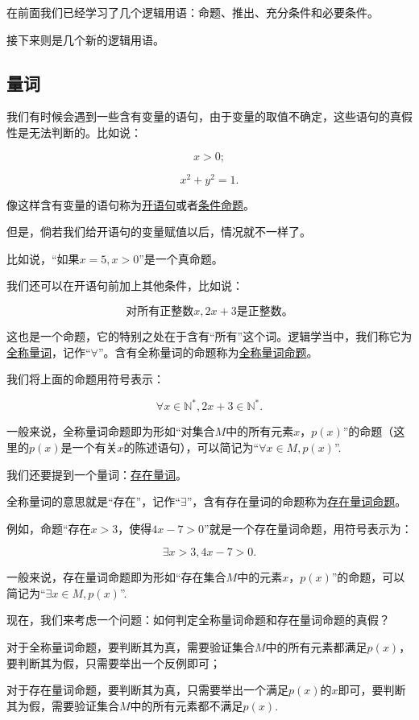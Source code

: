 \documentclass[lang=cn,math=cm,chinesefont=nofont,11pt,scheme=chinese,onecol]{elegantbook}
\begin{document}
在前面我们已经学习了几个逻辑用语：命题、推出、充分条件和必要条件。

接下来则是几个新的逻辑用语。

\subsection{量词}

我们有时候会遇到一些含有变量的语句，由于变量的取值不确定，这些语句的真假性是无法判断的。比如说：

$$x>0;$$

$$x^2+y^2=1.$$

像这样含有变量的语句称为\underline{开语句}或者\underline{条件命题}。

但是，倘若我们给开语句的变量赋值以后，情况就不一样了。

比如说，“如果$x=5,x>0$”是一个真命题。

我们还可以在开语句前加上其他条件，比如说：

$$\text{对所有正整数}x,2x+3\text{是正整数。}$$

这也是一个命题，它的特别之处在于含有“所有”这个词。逻辑学当中，我们称它为\underline{全称量词}，记作“$\forall$”。含有全称量词的命题称为\underline{全称量词命题}。

我们将上面的命题用符号表示：

$$\forall x\in\mathbb{N}^*,2x+3\in\mathbb{N}^*.$$

一般来说，全称量词命题即为形如“对集合$M$中的所有元素$x$，$p(x)$”的命题（这里的$p(x)$是一个有关$x$的陈述语句），可以简记为“$\forall x\in M,p(x)$”.

\hspace*{\fill}

我们还要提到一个量词：\underline{存在量词}。

全称量词的意思就是“存在”，记作“$\exists$”，含有存在量词的命题称为\underline{存在量词命题}。

例如，命题“存在$x>3$，使得$4x-7>0$”就是一个存在量词命题，用符号表示为：

$$\exists x>3,4x-7>0.$$

一般来说，存在量词命题即为形如“存在集合$M$中的元素$x$，$p(x)$”的命题，可以简记为“$\exists x\in M,p(x)$”.

现在，我们来考虑一个问题：如何判定全称量词命题和存在量词命题的真假？

对于全称量词命题，要判断其为真，需要验证集合$M$中的所有元素都满足$p(x)$，要判断其为假，只需要举出一个反例即可；

对于存在量词命题，要判断其为真，只需要举出一个满足$p(x)$的$x$即可，要判断其为假，需要验证集合$M$中的所有元素都不满足$p(x)$.
\end{document}
